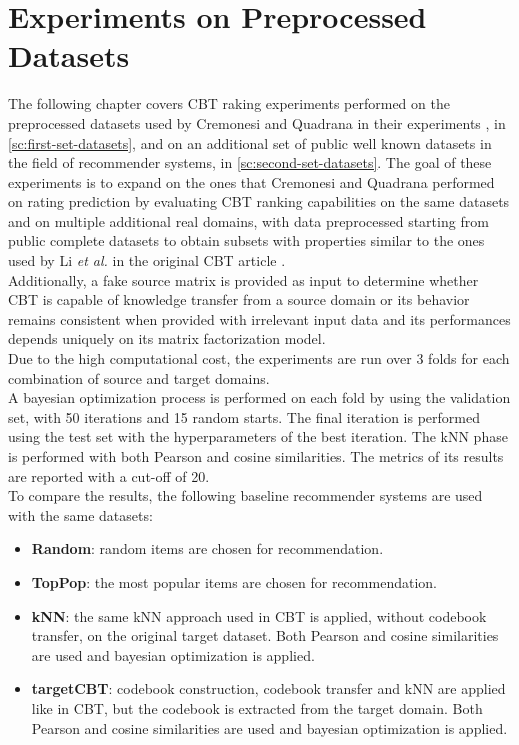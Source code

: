 \chapter{Experiments on Preprocessed Datasets}
\label{ch:experiments-preprocessed}

The following chapter covers CBT raking experiments performed on the preprocessed datasets used by Cremonesi and Quadrana in their experiments \cite{10.1145/2645710.2645769}, in \autoref{sc:first-set-datasets}, and on an additional set of public well known datasets in the field of recommender systems, in \autoref{sc:second-set-datasets}. The goal of these experiments is to expand on the ones that Cremonesi and Quadrana performed on rating prediction by evaluating CBT ranking capabilities on the same datasets and on multiple additional real domains, with data preprocessed starting from public complete datasets to obtain subsets with properties similar to the ones used by Li \textit{et al.} in the original CBT article \cite{10.5555/1661445.1661773}.\\
Additionally, a fake source matrix is provided as input to determine whether CBT is capable of knowledge transfer from a source domain or its behavior remains consistent when provided with irrelevant input data and its performances depends uniquely on its matrix factorization model.\\
Due to the high computational cost, the experiments are run over 3 folds for each combination of source and target domains.\\
A bayesian optimization process is performed on each fold by using the validation set, with 50 iterations and 15 random starts. The final iteration is performed using the test set with the hyperparameters of the best iteration. The kNN phase is performed with both Pearson and cosine similarities. The metrics of its results are reported with a cut-off of 20.\\
To compare the results, the following baseline recommender systems are used with the same datasets:
\begin{itemize}
\item \textbf{Random}: random items are chosen for recommendation.
\item \textbf{TopPop}: the most popular items are chosen for recommendation.
\item \textbf{kNN}: the same kNN approach used in CBT is applied, without codebook transfer, on the original target dataset. Both Pearson and cosine similarities are used and bayesian optimization is applied.
\item \textbf{targetCBT}: codebook construction, codebook transfer and kNN are applied like in CBT, but the codebook is extracted from the target domain. Both Pearson and cosine similarities are used and bayesian optimization is applied.
\end{itemize}



